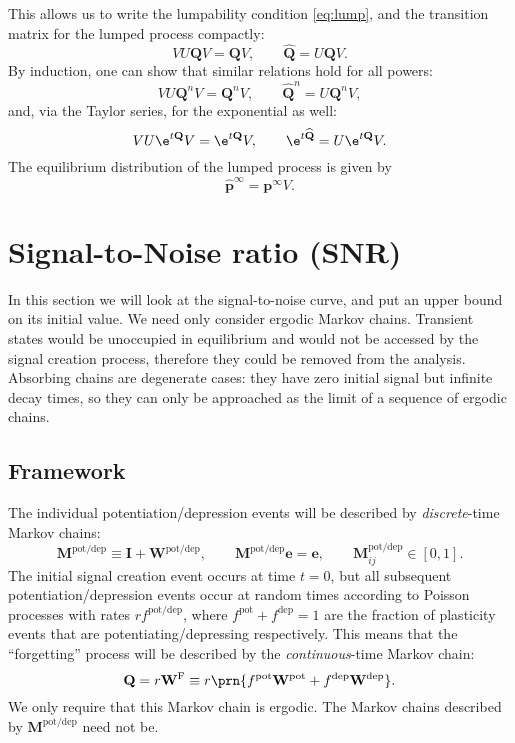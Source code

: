 \documentclass{article} %
\newcommand{\I}{\mathbf{I}}
\newcommand{\onev}{\mathbf{e}}
\newcommand{\MM}{\mathbf{Q}}
\newcommand{\pr}{\mathbf{p}}
\newcommand{\eq}{\pr^\infty}
\newcommand{\W}{\mathbf{W}}
\newcommand{\M}{\mathbf{M}}
\newcommand{\frg}{\W^{\mathrm{F}}}
\newcommand{\pot}{^{\text{pot}}}
\newcommand{\dep}{^{\text{dep}}}
\newcommand{\potdep}{^{\text{pot/dep}}}
\begin{document}
This allows us to write the lumpability condition \eqref{eq:lump}, and the transition matrix for the lumped process compactly:
%
\begin{equation}\label{eq:lumpcompact}
  VU\MM V = \MM V,
  \qquad
  \widehat{\MM} = U\MM V.
\end{equation}
%
By induction, one can show that similar relations hold for all powers:
%
\begin{equation}\label{eq:lumppower}
  VU\MM^nV = \MM^nV,
  \qquad
  \widehat{\MM}^n = U\MM^n V,
\end{equation}
%
and, via the Taylor series, for the exponential as well:
%
\begin{equation}\label{eq:lumpexp}
  VU \e^{t\MM} V = \e^{t\MM}V,
  \qquad
  \e^{t\widehat{\MM}} = U\e^{t\MM} V.
\end{equation}
%
The equilibrium distribution of the lumped process is given by
%
\begin{equation}\label{eq:lumpeq}
  \widehat{\mathbf{p}}^\infty = \eq V.
\end{equation}
%


\section{Signal-to-Noise ratio (SNR)}\label{sec:SNR}

In this section we will look at the signal-to-noise curve, and put an upper bound on its initial value.
We need only consider ergodic Markov chains.
Transient states would be unoccupied in equilibrium and would not be accessed by the signal creation process, therefore they could be removed from the analysis.
Absorbing chains are degenerate cases: they have zero initial signal but infinite decay times, so they can only be approached as the limit of a sequence of ergodic chains.

\subsection{Framework}\label{sec:framework}

The individual potentiation/depression events will be described by \emph{discrete}-time Markov chains:
%
\begin{equation}\label{eq:MWdef}
  \M\potdep \equiv \I + \W\potdep,
  \qquad
  \M\potdep\onev = \onev,
  \qquad
  \M\potdep_{ij} \in [0,1].
\end{equation}
%
The initial signal creation event occurs at time $t=0$, but all subsequent potentiation/depression events occur at random times according to Poisson processes with rates $rf\potdep$, where $f\pot +f\dep =1$ are the fraction of plasticity events that are potentiating/depressing respectively.
This means that the ``forgetting'' process will be described by the \emph{continuous}-time Markov chain:
%
\begin{equation}\label{eq:forgetting}
  \MM = r \frg \equiv r\prn{f\pot\W\pot + f\dep\W\dep}.
\end{equation}
%
We only require that this Markov chain is ergodic.
The Markov chains described by $\M\potdep $ need not be.
\end{document}
